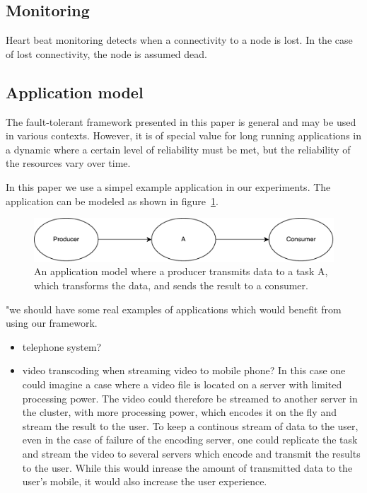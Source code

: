 \documentclass{cslthse-msc}
\begin{document}
\subsection{Monitoring}
Heart beat monitoring detects when a connectivity to a node is lost. In the case of lost connectivity, the node is assumed dead.

\subsection{Application model}
The fault-tolerant framework presented in this paper is general and may be used in various contexts. However, it is of special value for long running applications in a dynamic where a certain level of reliability must be met, but the reliability of the resources vary over time.

In this paper we use a simpel example application in our experiments. The application can be modeled as shown in figure~\ref{fig:app_model}.

\begin{figure}[!hbt]
\centering
\includegraphics[scale=0.5]{images/app_model.pdf} 
\caption{An application model where a producer transmits data to a task A, which transforms the data, and sends the result to a consumer.}\label{fig:app_model}
\end{figure}

"we should have some real examples of applications which would benefit from using our framework. 
\begin{itemize}
\item telephone system?
\item video transcoding when streaming video to mobile phone? In this case one could imagine a case where a video file is located on a server with limited processing power. The video could therefore be streamed to another server in the cluster, with more processing power, which encodes it on the fly and stream the result to the user. To keep a continous stream of data to the user, even in the case of failure of the encoding server, one could replicate the task and stream the video to several servers which encode and transmit the results to the user. While this would inrease the amount of transmitted data to the user's mobile, it would also increase the user experience.
\end{itemize}
\end{document}

